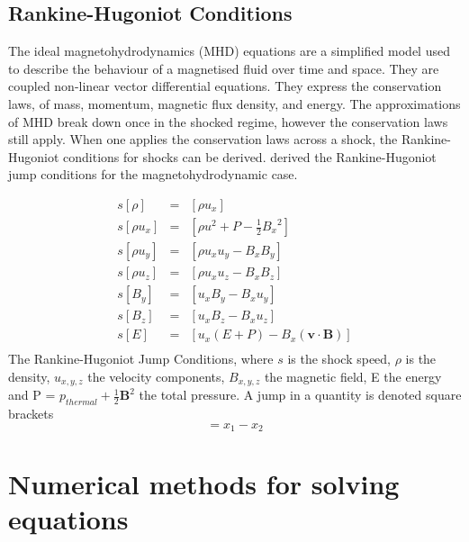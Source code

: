 \subsection{Rankine-Hugoniot Conditions}


The ideal magnetohydrodynamics (MHD) equations are a simplified model used to describe the behaviour of a magnetised fluid over time and space. They are coupled non-linear vector differential equations.
They express the conservation laws, of mass, momentum, magnetic flux density, and energy. 
The approximations of MHD break down once in the shocked regime, however the conservation laws still apply. 
When one applies the conservation laws across a shock, the Rankine-Hugoniot conditions for shocks can be derived. 
\citet{1950PhRv...80..692D} derived the Rankine-Hugoniot jump conditions for the magnetohydrodynamic case.

\begin{eqnarray*}
s [\rho]&=& [\rho u_x] \\
s [\rho u_x]&=& [\rho u^2 + P -\frac{1}{2}{B_x}^2] \\
s [\rho u_y]&=& [ \rho u_x u_y - B_x B_y] \\
s [\rho u_z]&=& [\rho u_x u_z - B_x B_z] \\
s [B_y]&=& [u_x B_y - B_x u_y]\\
s [B_z]&=& [u_x B_z - B_x u_z]\\
s [E] &=& [ u_x \left( E + P\right) -B_x\left( \mathbf{v \cdot B} \right)] \\
\end{eqnarray*}
The Rankine-Hugoniot Jump Conditions, where
$s$ is the shock speed, $\rho$ is the density, $u_{x,y,z}$ the velocity components, $B_{x,y,z}$ the magnetic field, E the energy and P = $p_{thermal} + \frac{1}{2}\mathbf{B}^2 $ the total pressure.
A jump in a quantity is denoted square brackets
\begin{equation}
[x] = x_1 - x_2
\end{equation}


\section{Numerical methods for solving equations}

